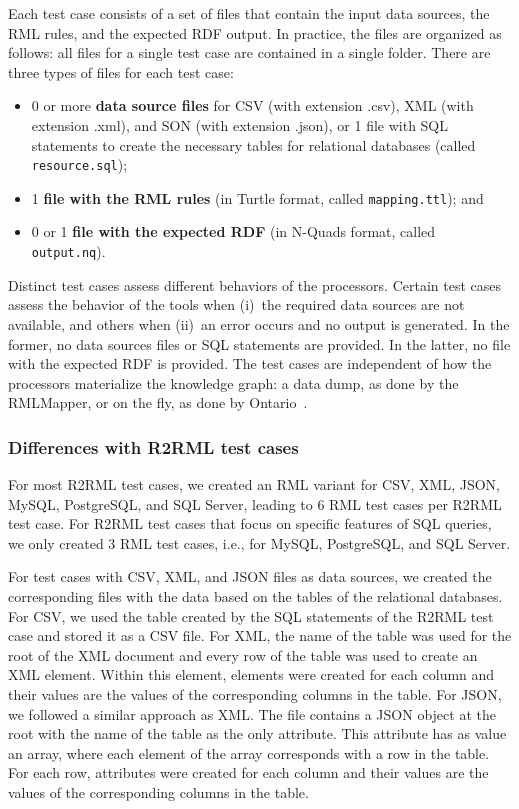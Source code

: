 Each test case consists of a set of files that contain the input data sources, the RML rules, and the expected RDF output. In practice, the files are organized as follows: all files for a single test case are contained in a single folder. There are three types of files for each test case:

\begin{itemize}
  \item 0 or more \textbf{data source files} for CSV (with extension .csv), XML (with extension .xml), and SON (with extension .json), or 
  1 file with SQL statements to create the necessary tables for relational databases (called \verb|resource.sql|);
  \item 1 \textbf{file with the RML rules} (in Turtle format, called \verb|mapping.ttl|); and
  \item 0 or 1 \textbf{file with the expected RDF} (in N-Quads format, called \verb|output.nq|).
\end{itemize}

Distinct test cases assess different behaviors of the processors. Certain test cases assess the behavior of the tools when (i)~the required data sources are not available, and others when (ii)~an error occurs and no output is generated. In the former, no data sources files or SQL statements are provided. In the latter, no file with the expected RDF is provided. The test cases are independent of how the processors materialize the knowledge graph: a data dump, as done by the RMLMapper, or on the fly, as done by Ontario~\citep{endris2019ontario}.

\subsubsection{Differences with R2RML test cases}
For most R2RML test cases, we created an RML variant for CSV, XML, JSON, MySQL, PostgreSQL, and SQL Server, leading to 6 RML test cases per R2RML test case. For R2RML test cases that focus on specific features of SQL queries, we only created 3 RML test cases, i.e., for MySQL, PostgreSQL, and SQL Server.

For test cases with CSV, XML, and JSON files as data sources, we created the corresponding files with the data based on the tables of the relational databases. For CSV, we used the table created by the SQL statements of the R2RML test case and stored it as a CSV file. For XML, the name of the table was used for the root of the XML document and every row of the table was used to create an XML element. Within this element, elements were created for each column and their values are the values of the corresponding columns in the table. For JSON, we followed a similar approach as XML. The file contains a JSON object at the root with the name of the table as the only attribute. This attribute has as value an array, where each element of the array corresponds with a row in the table. For each row, attributes were created for each column and their values are the values of the corresponding columns in the table.

